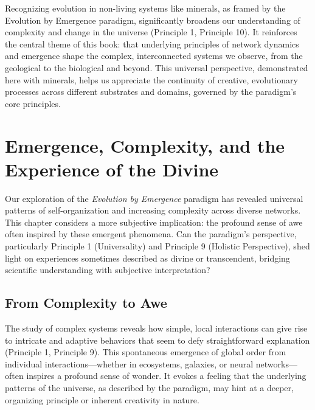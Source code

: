 \documentclass[12pt,openany]{book}
\let\cleardoublepage\clearpage %
\begin{document}
Recognizing evolution in non-living systems like minerals, as framed by the Evolution by Emergence paradigm, significantly broadens our understanding of complexity and change in the universe (Principle 1, Principle 10). It reinforces the central theme of this book: that underlying principles of network dynamics and emergence shape the complex, interconnected systems we observe, from the geological to the biological and beyond. This universal perspective, demonstrated here with minerals, helps us appreciate the continuity of creative, evolutionary processes across different substrates and domains, governed by the paradigm's core principles. %
\cleardoublepage


\chapter{Emergence, Complexity, and the Experience of the Divine} %
\label{ch:EmergenceDivine}

Our exploration of the \emph{Evolution by Emergence} paradigm has revealed universal patterns of self-organization and increasing complexity across diverse networks. This chapter considers a more subjective implication: the profound sense of awe often inspired by these emergent phenomena. Can the paradigm's perspective, particularly Principle 1 (Universality) and Principle 9 (Holistic Perspective), shed light on experiences sometimes described as divine or transcendent, bridging scientific understanding with subjective interpretation? %

\section{From Complexity to Awe}
The study of complex systems reveals how simple, local interactions can give rise to intricate and adaptive behaviors that seem to defy straightforward explanation (Principle 1, Principle 9). This spontaneous emergence of global order from individual interactions—whether in ecosystems, galaxies, or neural networks—often inspires a profound sense of wonder. It evokes a feeling that the underlying patterns of the universe, as described by the paradigm, may hint at a deeper, organizing principle or inherent creativity in nature.
\end{document}

